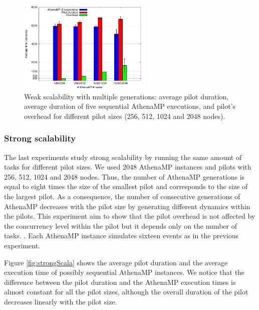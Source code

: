 \begin{figure}[!htb]
        \includegraphics[height=4.5cm,width=\columnwidth]{./figures/NGE/weak2.pdf}
    \caption{Weak scalability with multiple generations: average pilot
    duration, average duration of five sequential AthenaMP executions, and
    pilot's overhead for different pilot sizes (256, 512, 1024 and 2048 nodes).}
\label{fig:weakScal2a}
\end{figure}



\subsubsection{Strong scalability}

The last experiments %
study strong scalability by running the same amount of tasks for different pilot sizes. We used
2048 AthenaMP instances and %
pilots with 256, 512, 1024 and 2048 nodes. Thus, the number of AthenaMP generations is equal to eight times the size of the smallest pilot and corresponds to the size of the largest pilot. As a consequence, the number of consecutive generations of AthenaMP decreases with the pilot size by generating different dynamics within the pilots. This experiment aim to show that the pilot overhead is not affected by the concurrency level within the pilot but it depends only on the number of tasks.  
. Each AthenaMP instance
simulates sixteen events as in the previous experiment.

Figure \ref{fig:strongScala} %
shows the average pilot duration and the average execution time of possibly
sequential AthenaMP instances.  We %
notice that the difference between the pilot duration and the AthenaMP execution
times is almost constant for all the pilot sizes, although the overall duration
of the pilot decreases linearly with the pilot size.

